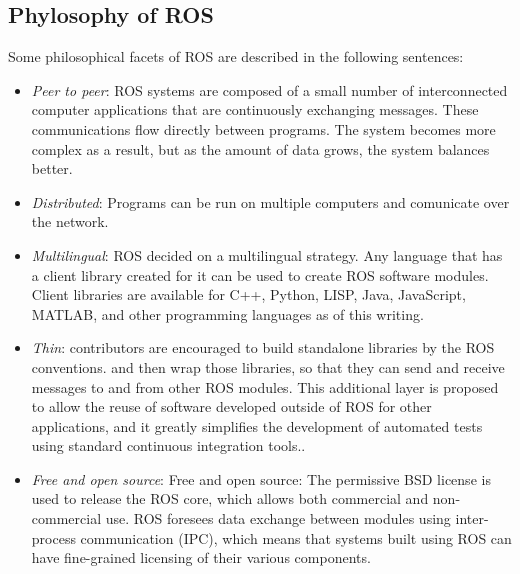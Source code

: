  \subsection{Phylosophy of ROS}
Some philosophical facets of ROS are described in the following sentences:\\
\begin{itemize}
\item \textit{Peer to peer}: ROS systems are composed of a small number of interconnected computer applications that are continuously exchanging messages. These communications flow directly between programs. The system becomes more complex as a result, but as the amount of data grows, the system balances better.\\
\item \textit{Distributed}: Programs can be run on multiple computers and comunicate over the network.
\item \textit{Multilingual}: ROS decided on a multilingual strategy. Any language that has a client library created for it can be used to create ROS software modules. Client libraries are available for C++, Python, LISP, Java, JavaScript, MATLAB, and other programming languages as of this writing. \\
\item \textit{Thin}: contributors are encouraged to build standalone libraries by the ROS conventions. and then wrap those libraries, so that they can send and receive messages to and from other ROS modules. This additional layer is proposed to allow the reuse of software developed outside of ROS for other applications, and it greatly simplifies the development of automated tests using standard continuous integration tools..\\
\item \textit{Free and open source}: Free and open source: The permissive BSD license is used to release the ROS core, which allows both commercial and non-commercial use. ROS foresees data exchange between modules using inter-process communication (IPC), which means that systems built using ROS can have fine-grained licensing of their various components.\\
\end{itemize}

